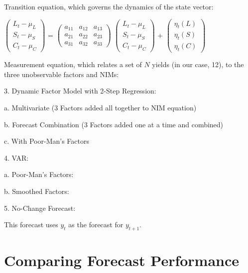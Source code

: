 \documentclass[12pt]{article}
\begin{document}
Transition equation, which governs the dynamics of the state vector:

$\begin{pmatrix} {L_t - \mu_L} \\ {S_t - \mu_S} \\ {C_t - \mu_C} \end{pmatrix}$ =
$\begin{pmatrix} a_{11} & a_{12} & a_{13} \\ a_{21} & a_{22} & a_{23} \\ a_{31} & a_{32} & a_{33} \end{pmatrix}$
$\begin{pmatrix} {L_t - \mu_L} \\ {S_t - \mu_S} \\ {C_t - \mu_C} \end{pmatrix}$ +
$\begin{pmatrix} {\eta_t(L)} \\ {\eta_t(S)} \\ {\eta_t(C)} \end{pmatrix}$

Measurement equation, which relates a set of $N$ yields (in our case, 12), to the three unobservable factors and NIMs:


3. Dynamic Factor Model with 2-Step Regression:
	
	a. Multivariate (3 Factors added all together to NIM equation)

	b. Forecast Combination (3 Factors added one at a time and combined)

	c. With Poor-Man's Factors

4. VAR:
	
	a. Poor-Man's Factors:

	b. Smoothed Factors:

5. No-Change Forecast:

This forecast uses $y_t$ as the forecast for $y_{t+1}$.


\section{Comparing Forecast Performance}

\clearpage
\end{document}
